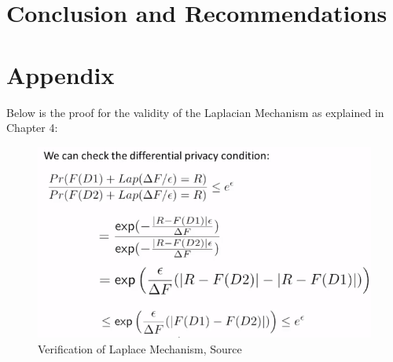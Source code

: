 \documentclass[12pt]{report}
\theoremstyle{named}
\begin{document}
\chapter{Conclusion and Recommendations}




\appendix
\chapter{Appendix}
\label{Appendix}
Below is the proof for the validity of the Laplacian Mechanism as explained in Chapter 4:
\begin{figure}[ht]
\centering
        \includegraphics[width=130mm,scale=1]{Images/ProofForLaplace.PNG}
    \caption{Verification of Laplace Mechanism, Source\cite{LaplaceVaiditity}}
    \label{fig:Laplace Verified}
\end{figure}
\end{document}
